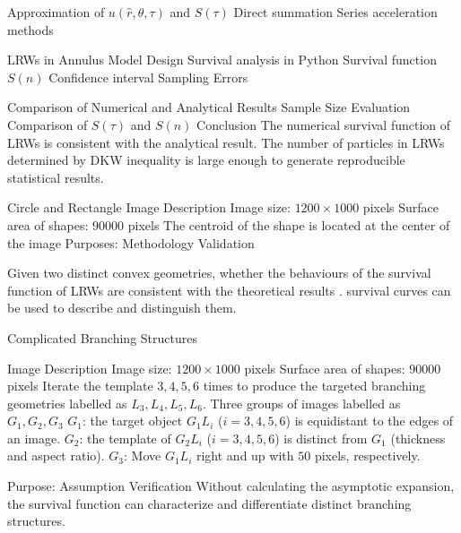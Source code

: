 \documentclass{article}
\begin{document}
\begin{outline}[enumerate]
    \2 Approximation of $u(\hat r, \theta, \tau)$ and $S(\tau)$
      \3 Direct summation
      \3 Series acceleration methods   

  \1 LRWs in Annulus
    \2 Model Design
    \2 Survival analysis in Python \cite{cameron_davidson_pilon_2020_4313838}
       \3 Survival function $S(n)$
       \3 Confidence interval
    \2 Sampling Errors

  \1 Comparison of Numerical and Analytical Results
    \2 Sample Size Evaluation
    \2 Comparison of $S(\tau)$ and $S(n)$
    \2 Conclusion
      \3 The numerical survival function of LRWs is consistent with the analytical result.
      \3 The number of particles in LRWs determined by DKW inequality is large enough to generate reproducible statistical results. 



  \newpage


  \1 Circle and Rectangle
    \2 Image Description
       \3 Image size: $1200 \times 1000$ pixels
       \3 Surface area of shapes: $90000$ pixels
       \3 The centroid of the shape is located at the center of the image
    \2 Purposes: Methodology Validation
       \par 
       Given two distinct convex geometries, whether
       \3 the behaviours of the survival function of LRWs are consistent with the theoretical results \cite{DesjardinsS1994HAFO}.
       \3 survival curves can be used to describe and distinguish them.

  \1 Complicated Branching Structures
       
    \2 Image Description
       \3 Image size: $1200 \times 1000$ pixels
       \3 Surface area of shapes: $90000$ pixels
       \3 Iterate the template $3, 4, 5, 6$ times to produce the targeted branching geometries labelled as $L_3, L_4, L_5, L_6$.
       \3 Three groups of images labelled as $G_1, G_2, G_3$
         \4 $G_1$: the target object $G_1 L_i$ ($i=3, 4, 5, 6$) is equidistant to the edges of an image.
         \4 $G_2$: the template of $G_2 L_i$ ($i=3, 4, 5, 6$) is distinct from $G_1$ (thickness and aspect ratio). 
         \4 $G_3$: Move $G_1 L_i$ right and up with $50$ pixels, respectively.

    \2 Purpose: Assumption Verification
      \3 Without calculating the asymptotic expansion, the survival function can characterize and differentiate distinct branching structures.
    



\end{outline}
\end{document}
